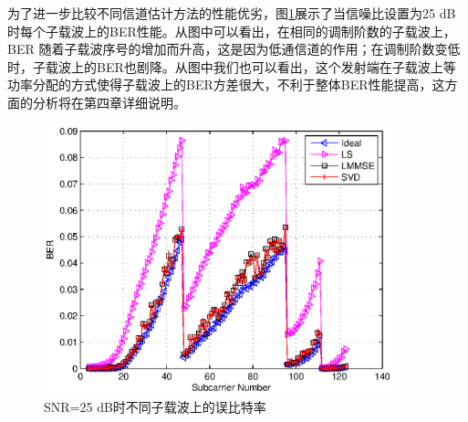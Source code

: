为了进一步比较不同信道估计方法的性能优劣，图\ref{fig:BER_sc}展示了当信噪比设置为25 dB时每个子载波上的BER性能。从图中可以看出，在相同的调制阶数的子载波上，BER 随着子载波序号的增加而升高，这是因为低通信道的作用；在调制阶数变低时，子载波上的BER也剧降。从图中我们也可以看出，这个发射端在子载波上等功率分配的方式使得子载波上的BER方差很大，不利于整体BER性能提高，这方面的分析将在第四章详细说明。
\begin{figure}[htbp]
\centering
\includegraphics[width=0.9\textwidth]{figures/chapter-3/BER_sc.eps}
\caption{SNR=25 dB时不同子载波上的误比特率}
\label{fig:BER_sc}
\end{figure}


